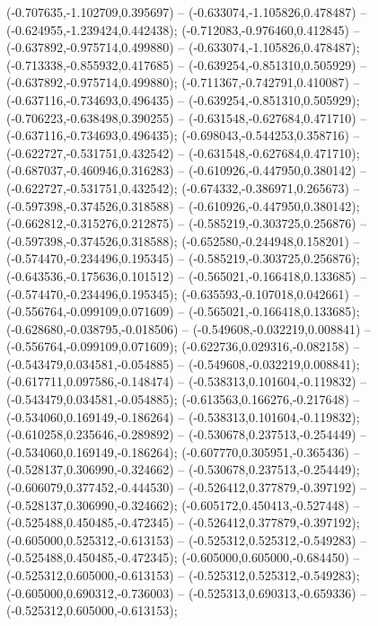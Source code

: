  (-0.707635,-1.102709,0.395697) -- (-0.633074,-1.105826,0.478487) -- (-0.624955,-1.239424,0.442438);
 (-0.712083,-0.976460,0.412845) -- (-0.637892,-0.975714,0.499880) -- (-0.633074,-1.105826,0.478487);
 (-0.713338,-0.855932,0.417685) -- (-0.639254,-0.851310,0.505929) -- (-0.637892,-0.975714,0.499880);
 (-0.711367,-0.742791,0.410087) -- (-0.637116,-0.734693,0.496435) -- (-0.639254,-0.851310,0.505929);
 (-0.706223,-0.638498,0.390255) -- (-0.631548,-0.627684,0.471710) -- (-0.637116,-0.734693,0.496435);
 (-0.698043,-0.544253,0.358716) -- (-0.622727,-0.531751,0.432542) -- (-0.631548,-0.627684,0.471710);
 (-0.687037,-0.460946,0.316283) -- (-0.610926,-0.447950,0.380142) -- (-0.622727,-0.531751,0.432542);
 (-0.674332,-0.386971,0.265673) -- (-0.597398,-0.374526,0.318588) -- (-0.610926,-0.447950,0.380142);
 (-0.662812,-0.315276,0.212875) -- (-0.585219,-0.303725,0.256876) -- (-0.597398,-0.374526,0.318588);
 (-0.652580,-0.244948,0.158201) -- (-0.574470,-0.234496,0.195345) -- (-0.585219,-0.303725,0.256876);
 (-0.643536,-0.175636,0.101512) -- (-0.565021,-0.166418,0.133685) -- (-0.574470,-0.234496,0.195345);
 (-0.635593,-0.107018,0.042661) -- (-0.556764,-0.099109,0.071609) -- (-0.565021,-0.166418,0.133685);
 (-0.628680,-0.038795,-0.018506) -- (-0.549608,-0.032219,0.008841) -- (-0.556764,-0.099109,0.071609);
 (-0.622736,0.029316,-0.082158) -- (-0.543479,0.034581,-0.054885) -- (-0.549608,-0.032219,0.008841);
 (-0.617711,0.097586,-0.148474) -- (-0.538313,0.101604,-0.119832) -- (-0.543479,0.034581,-0.054885);
 (-0.613563,0.166276,-0.217648) -- (-0.534060,0.169149,-0.186264) -- (-0.538313,0.101604,-0.119832);
 (-0.610258,0.235646,-0.289892) -- (-0.530678,0.237513,-0.254449) -- (-0.534060,0.169149,-0.186264);
 (-0.607770,0.305951,-0.365436) -- (-0.528137,0.306990,-0.324662) -- (-0.530678,0.237513,-0.254449);
 (-0.606079,0.377452,-0.444530) -- (-0.526412,0.377879,-0.397192) -- (-0.528137,0.306990,-0.324662);
 (-0.605172,0.450413,-0.527448) -- (-0.525488,0.450485,-0.472345) -- (-0.526412,0.377879,-0.397192);
 (-0.605000,0.525312,-0.613153) -- (-0.525312,0.525312,-0.549283) -- (-0.525488,0.450485,-0.472345);
 (-0.605000,0.605000,-0.684450) -- (-0.525312,0.605000,-0.613153) -- (-0.525312,0.525312,-0.549283);
 (-0.605000,0.690312,-0.736003) -- (-0.525313,0.690313,-0.659336) -- (-0.525312,0.605000,-0.613153);

